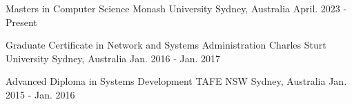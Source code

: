 

\begin{cventries}

  \cventry
    {Masters in Computer Science} %
    {Monash University} %
    {Sydney, Australia} %
    {April. 2023 - Present} %
   {
      \begin{cvitems} %
      \end{cvitems}
    }


  \cventry
    {Graduate Certificate in Network and Systems Administration} %
    {Charles Sturt University} %
    {Sydney, Australia} %
    {Jan. 2016 - Jan. 2017} %
   {
      \begin{cvitems} %
      \end{cvitems}
    }


  \cventry
    {Advanced Diploma in Systems Development} %
    {TAFE NSW} %
    {Sydney, Australia} %
    {Jan. 2015 - Jan. 2016} %
   {
      \begin{cvitems} %
      \end{cvitems}
    }

\end{cventries}
